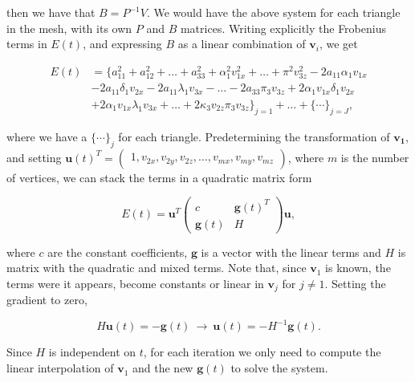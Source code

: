 \documentclass[12pt]{article}
\begin{document}
then we have that $B = P^{-1}V$.
We would have the above system for each triangle in the mesh, with its own $P$ and $B$ matrices.  
Writing explicitly the Frobenius terms in $E(t)$, and expressing $B$ as a linear combination of $\mathbf{v}_i$, we get

\begin{align*}
E(t) &= \lbrace a_{11}^2 + a_{12}^2 + \ldots + a_{33}^2 + \alpha_1^2 v_{1x}^2 + \ldots + \pi^2 v_{3z}^2 - 2 a_{11} \alpha_1 v_{1x} \\
& - 2 a_{11} \delta_1 v_{2x} - 2 a_{11} \lambda_1 v_{3x} - \ldots - 2 a_{33} \pi_3 v_{3z} + 2 \alpha_1 v_{1x} \delta_1 v_{2x} \\ 
& + 2 \alpha_1 v_{1x} \lambda_1 v_{3x} + \ldots + 2 \kappa_3 v_{2z} \pi_3 v_{3z} \rbrace_{j = 1} + \ldots + \lbrace \cdots \rbrace_{j = J},
\end{align*}

where we have a $\lbrace \cdots \rbrace_j$ for each triangle.
Predetermining the transformation of $\mathbf{v_1}$, and setting 
$\mathbf{u}(t)^T = \begin{pmatrix} 1, v_{2x}, v_{2y}, v_{2z}, \ldots, v_{mx}, v_{my}, v_{mz} \end{pmatrix}$, where $m$ is the number of vertices, we can stack the terms in a quadratic matrix form 

\begin{equation*}
E(t) = \mathbf{u}^T  \begin{pmatrix}
c & \mathbf{g}(t)^T \\
\mathbf{g}(t) & H
\end{pmatrix} \mathbf{u},
\end{equation*}

where $c$ are the constant coefficients, $\mathbf{g}$ is a vector with the linear terms and $H$ is matrix with the quadratic and mixed terms.
Note that, since $\mathbf{v}_1$ is known, the terms were it appears, become constants or linear in $\mathbf{v}_j$ for $j \neq 1$.
Setting the gradient to zero,

\begin{equation*}
H \mathbf{u}(t) = -\mathbf{g}(t) ~ \rightarrow ~ \mathbf{u}(t) = - H ^{-1} \mathbf{g}(t).
\end{equation*}

Since $H$ is independent on $t$, for each iteration we only need to compute the linear interpolation of $\mathbf{v}_1$ and the new $\mathbf{g}(t)$ to solve the system.
\end{document}
